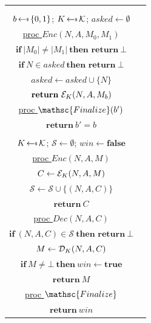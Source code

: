 \documentclass[11pt]{article}
\makeatletter
\newcommand{\procfont}[1]{\mathsc{#1}}
\newcommand{\Initialize}{\procfont{Initialize}}
\newcommand{\Finalize}{\procfont{Finalize}}
\newcommand{\FinalizeCodeNoarg}{\underline{\textrm{proc} $\Finalize$}}
\newcommand{\Onquery}[2]{\underline{\textrm{proc} $#1(#2)$}}
\newcommand{\InitializeCode}{\underline{\textrm{proc} $\Initialize$}}
\newcommand{\FinalizeCode}[1]{\underline{\textrm{proc} $\Finalize(#1)$}}
\newcommand{\getsr}{{{\,\leftarrow{\hspace*{-3pt}\raisebox{.75pt}{$\scriptscriptstyle\$$}}\,}}}
\newcommand{\calK}{{\cal K}}
\newcommand{\calD}{{\cal D}}
\newcommand{\calE}{{\cal E}}
\newcommand{\main}{\procfont{Game}}
\newcommand{\gamesfontsize}{\small}
\newcommand{\hfpagess}[4]{
        \begin{tabular}{c@{\hspace*{.5em}}c}
        \framebox{\begin{minipage}[t]{#1\textwidth}\setstretch{1.2}\gamesfontsize #3 \end{minipage}}
        &
        \framebox{\begin{minipage}[t]{#2\textwidth}\setstretch{1.2}\gamesfontsize #4 \end{minipage}}
        \end{tabular}
    }
\newcommand{\gameName}[1]{\underline{$\main$ #1} \\}
\makeatother
\begin{document}
\smallskip
{\hfuzz=3pt\begin{center}
\hfpagess{0.42}{0.51}{%
  \gameName{IND-CPA$^b$}
  \vspace*{-\topsep}
  \begin{tabbing}
  \hspace{0.6em}\=\hspace{1.2em}\=\kill
  \> \InitializeCode\\
  \>\> $b \getsr \{0,1\}$; $K \getsr \calK$; $\mathit{asked} \gets \emptyset$\\[3pt]
  \> \Onquery{Enc}{N,A,M_0,M_1}\\
  \>\> $\textbf{if}\ |M_0| \ne |M_1|\ \textbf{then return}\ \bot$\\
  \>\> $\textbf{if}\ N \in \mathit{asked}\ \textbf{then return}\ \bot$\\
  \>\> $\mathit{asked} \gets \mathit{asked} \cup \{N\}$\\
  \>\> $\textbf{return}\ \calE_K(N,A,M_b)$\\[3pt]
  \> \FinalizeCode{b'}\\
  \>\> $\textbf{return}\ b' = b$
  \end{tabbing}
}{%
  \gameName{INT-CTXT}
  \vspace*{-\topsep}
  \begin{tabbing}
  \hspace{0.6em}\=\hspace{1.2em}\=\kill
  \> \InitializeCode\\
  \>\> $K \getsr \calK$;\; $\mathcal{S} \gets \emptyset$;\; $\mathit{win} \gets \mathbf{false}$\\[3pt]
  \> \Onquery{Enc}{N,A,M}\\
  \>\> $C \gets \calE_K(N,A,M)$\\
  \>\> $\mathcal{S} \gets \mathcal{S}\cup\{(N,A,C)\}$\\
  \>\> $\textbf{return}\ C$\\[3pt]
  \> \Onquery{Dec}{N,A,C}\\
  \>\> $\textbf{if}\ (N,A,C)\in\mathcal{S}\ \textbf{then return}\ \bot$\\
  \>\> $M \gets \calD_K(N,A,C)$\\
  \>\> $\textbf{if}\ M \ne \bot\ \textbf{then}\ \mathit{win} \gets \mathbf{true}$\\
  \>\> $\textbf{return}\ M$\\[3pt]
  \> \FinalizeCodeNoarg\\
  \>\> $\textbf{return}\ \mathit{win}$
  \end{tabbing}
}
\end{center}}
\end{document}

